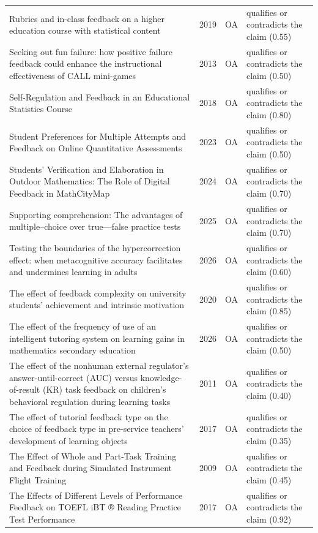 \begin{longtable}{@{}%
  >{\raggedright\arraybackslash}p{}c%
  >{\raggedright\arraybackslash}p{}%
  >{\raggedright\arraybackslash}p{}@{}}
Rubrics and in-class feedback on a higher education course with statistical content & 2019 & OA & qualifies or contradicts the claim (0.55) \\
Seeking out fun failure: how positive failure feedback could enhance the instructional effectiveness of CALL mini-games & 2013 & OA & qualifies or contradicts the claim (0.50) \\
Self-Regulation and Feedback in an Educational Statistics Course & 2018 & OA & qualifies or contradicts the claim (0.80) \\
Student Preferences for Multiple Attempts and Feedback on Online Quantitative Assessments & 2023 & OA & qualifies or contradicts the claim (0.50) \\
Students' Verification and Elaboration in Outdoor Mathematics: The Role of Digital Feedback in MathCityMap & 2024 & OA & qualifies or contradicts the claim (0.70) \\
Supporting comprehension: The advantages of multiple--choice over true---false practice tests & 2025 & OA & qualifies or contradicts the claim (0.70) \\
Testing the boundaries of the hypercorrection effect: when metacognitive accuracy facilitates and undermines learning in adults & 2026 & OA & qualifies or contradicts the claim (0.60) \\
The effect of feedback complexity on university students' achievement and intrinsic motivation & 2020 & OA & qualifies or contradicts the claim (0.85) \\
The effect of the frequency of use of an intelligent tutoring system on learning gains in mathematics secondary education & 2026 & OA & qualifies or contradicts the claim (0.50) \\
The effect of the nonhuman external regulator's answer-until-correct (AUC) versus knowledge-of-result (KR) task feedback on children's behavioral regulation during learning tasks & 2011 & OA & qualifies or contradicts the claim (0.40) \\
The effect of tutorial feedback type on the choice of feedback type in pre-service teachers' development of learning objects & 2017 & OA & qualifies or contradicts the claim (0.35) \\
The Effect of Whole and Part-Task Training and Feedback during Simulated Instrument Flight Training & 2009 & OA & qualifies or contradicts the claim (0.45) \\
The Effects of Different Levels of Performance Feedback on TOEFL iBT ® Reading Practice Test Performance & 2017 & OA & qualifies or contradicts the claim (0.92) \\

\end{longtable}
